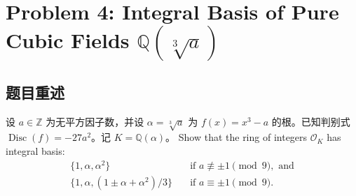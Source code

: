 \documentclass[]{article}
\begin{document}
	\pagebreak
	
	\section*{Problem 4: Integral Basis of Pure Cubic Fields $\mathbb{Q}(\sqrt[3]{a})$}
	
	\subsection*{题目重述}
	设 $a \in \mathbb{Z}$ 为无平方因子数，并设 $\alpha = \sqrt[3]{a}$ 为 $f(x) = x^3 - a$ 的根。已知判别式 $\operatorname{Disc}(f) = -27a^2$。记 $K = \mathbb{Q}(\alpha)$。
	Show that the ring of integers $\mathcal{O}_K$ has integral basis:
	\[ \begin{aligned}
		\{1, \alpha, \alpha^2\} & \quad \text{if } a \not\equiv \pm 1 \pmod 9, \text{ and} \\
		\{1, \alpha, (1 \pm \alpha + \alpha^2)/3\} & \quad \text{if } a \equiv \pm 1 \pmod 9.
	\end{aligned} \]
	
\end{document}
